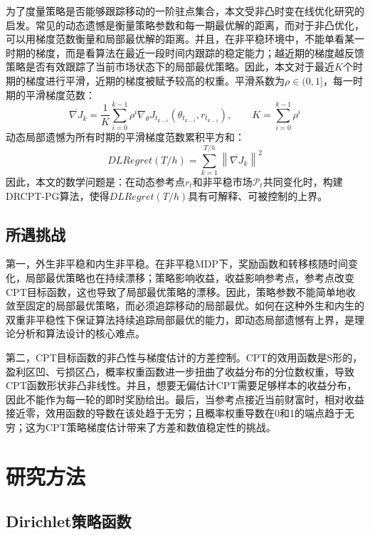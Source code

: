 \documentclass{sufethesismas}
\begin{document}
为了度量策略是否能够跟踪移动的一阶驻点集合，本文受非凸时变在线优化研究的启发\citep{hazan2017efficient,aydore2019dynamic}。常见的动态遗憾是衡量策略参数和每一期最优解的距离，而对于非凸优化，可以用梯度范数衡量和局部最优解的距离。并且，在非平稳环境中，不能单看某一时期的梯度，而是看算法在最近一段时间内跟踪的稳定能力；越近期的梯度越反馈策略是否有效跟踪了当前市场状态下的局部最优策略。因此，本文对于最近$K$个时期的梯度进行平滑，近期的梯度被赋予较高的权重。平滑系数为$\rho\in(0,1]$，每一时期的平滑梯度范数：
\begin{equation}
\label{eq:smoothed_gradient}
\overline{\nabla J}_k
=\frac{1}{K}
\sum_{i=0}^{k-1}
\rho^i
\nabla_\theta J_{t_{k-i}}(\theta_{t_{k-i}},r_{t_{k-i}}),
\qquad
K=
\sum_{i=0}^{k-1}\rho^i
\end{equation}
动态局部遗憾为所有时期的平滑梯度范数累积平方和：
\begin{equation}
\label{eq:dynamic_local_regret}
DLRegret(T/h)
=
\sum_{k=1}^{T/h}
\left\|
\overline{\nabla J}_k
\right\|^2
\end{equation}
因此，本文的数学问题是：在动态参考点$r_t$和非平稳市场$\mathcal{P}_t$共同变化时，构建DRCPT-PG算法，使得$DLRegret(T/h)$具有可解释、可被控制的上界。
\subsection{所遇挑战}

第一，外生非平稳和内生非平稳。在非平稳MDP下，奖励函数和转移核随时间变化，局部最优策略也在持续漂移；策略影响收益，收益影响参考点，参考点改变CPT目标函数，这也导致了局部最优策略的漂移。因此，策略参数不能简单地收敛至固定的局部最优策略，而必须追踪移动的局部最优。如何在这种外生和内生的双重非平稳性下保证算法持续追踪局部最优的能力，即动态局部遗憾有上界，是理论分析和算法设计的核心难点。

第二，CPT目标函数的非凸性与梯度估计的方差控制。CPT的效用函数是S形的，盈利区凹、亏损区凸，概率权重函数进一步扭曲了收益分布的分位数权重，导致CPT函数形状非凸非线性。并且，想要无偏估计CPT需要足够样本的收益分布，因此不能作为每一轮的即时奖励给出。最后，当参考点接近当前财富时，相对收益接近零，效用函数的导数在该处趋于无穷；且概率权重导数在0和1的端点趋于无穷；这为CPT策略梯度估计带来了方差和数值稳定性的挑战。

\section{研究方法}
\subsection{Dirichlet策略函数}
\end{document}
